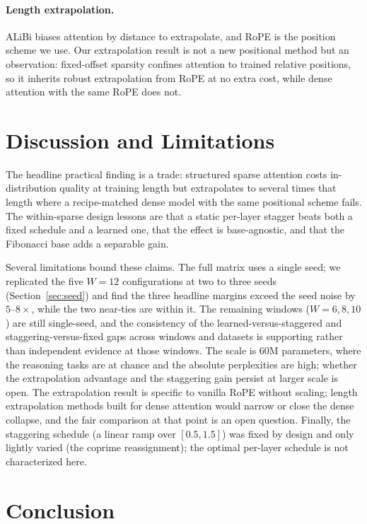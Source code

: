 \documentclass[11pt]{article}
\begin{document}
\paragraph{Length extrapolation.}
ALiBi \citep{press2021alibi} biases attention by distance to extrapolate, and RoPE
\citep{su2021roformer} is the position scheme we use. Our extrapolation result is
not a new positional method but an observation: fixed-offset sparsity confines
attention to trained relative positions, so it inherits robust extrapolation from
RoPE at no extra cost, while dense attention with the same RoPE does not.

\section{Discussion and Limitations}

The headline practical finding is a trade: structured sparse attention costs
in-distribution quality at training length but extrapolates to several times that
length where a recipe-matched dense model with the same positional scheme fails.
The within-sparse design lessons are that a static per-layer stagger beats both a
fixed schedule and a learned one, that the effect is base-agnostic, and that the
Fibonacci base adds a separable gain.

Several limitations bound these claims. The full matrix uses a single seed; we
replicated the five $W{=}12$ configurations at two to three seeds
(Section~\ref{sec:seed}) and find the three headline margins exceed the seed
noise by $5$--$8\times$, while the two near-ties are within it. The remaining
windows ($W{=}6,8,10$) are still single-seed, and the consistency of the
learned-versus-staggered and staggering-versus-fixed gaps across windows and
datasets is supporting rather than independent evidence at those windows. The
scale is 60M parameters, where the reasoning
tasks are at chance and the absolute perplexities are high; whether the
extrapolation advantage and the staggering gain persist at larger scale is open.
The extrapolation result is specific to vanilla RoPE without scaling; length
extrapolation methods built for dense attention would narrow or close the dense
collapse, and the fair comparison at that point is an open question. Finally, the
staggering schedule (a linear ramp over $[0.5,1.5]$) was fixed by design and only
lightly varied (the coprime reassignment); the optimal per-layer schedule is not
characterized here.

\section{Conclusion}
\end{document}
